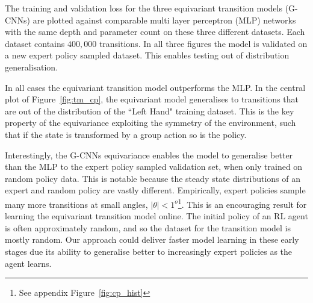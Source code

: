 \documentclass[mlabstract]{jmlr}
\begin{document}
The training and validation loss for the three equivariant transition models (G-CNNs) are plotted against comparable multi layer perceptron (MLP) networks with the same depth and parameter count on these three different datasets. Each dataset contains $400,000$ transitions. In all three figures the model is validated on a new expert policy sampled dataset. This enables testing out of distribution generalisation.

In all cases the equivariant transition model outperforms the MLP. In the central plot of Figure~\ref{fig:tm_cp}, the equivariant model generalises to transitions that are out of the distribution of the ``Left Hand" training dataset. This is the key property of the equivariance exploiting the symmetry of the environment, such that if the state is transformed by a group action so is the policy.

Interestingly, the G-CNNs equivariance enables the model to generalise better than the MLP to the expert policy sampled validation set, when only trained on random policy data. This is notable because the steady state distributions of an expert and random policy are vastly different. Empirically, expert policies sample many more transitions at small angles, $|\theta| < 1^o$\footnote{See appendix Figure~\ref{fig:cp_hist}}. This is an encouraging result for learning the equivariant transition model online. The initial policy of an RL agent is often approximately random, and so the dataset for the transition model is mostly random. Our approach could deliver faster model learning in these early stages due its ability to generalise better to increasingly expert policies as the agent learns.
\end{document}
